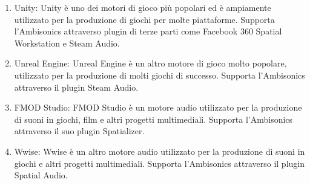 \begin{enumerate}
      \item Unity: Unity è uno dei motori di gioco più popolari ed è ampiamente utilizzato per la produzione di giochi per molte piattaforme. Supporta l'Ambisonics attraverso plugin di terze parti come Facebook 360 Spatial Workstation e Steam Audio.
      \item Unreal Engine: Unreal Engine è un altro motore di gioco molto popolare, utilizzato per la produzione di molti giochi di successo. Supporta l'Ambisonics attraverso il plugin Steam Audio.
      \item FMOD Studio: FMOD Studio è un motore audio utilizzato per la produzione di suoni in giochi, film e altri progetti multimediali. Supporta l'Ambisonics attraverso il suo plugin Spatializer.
      \item Wwise: Wwise è un altro motore audio utilizzato per la produzione di suoni in giochi e altri progetti multimediali. Supporta l'Ambisonics attraverso il plugin Spatial Audio.
\end{enumerate}

